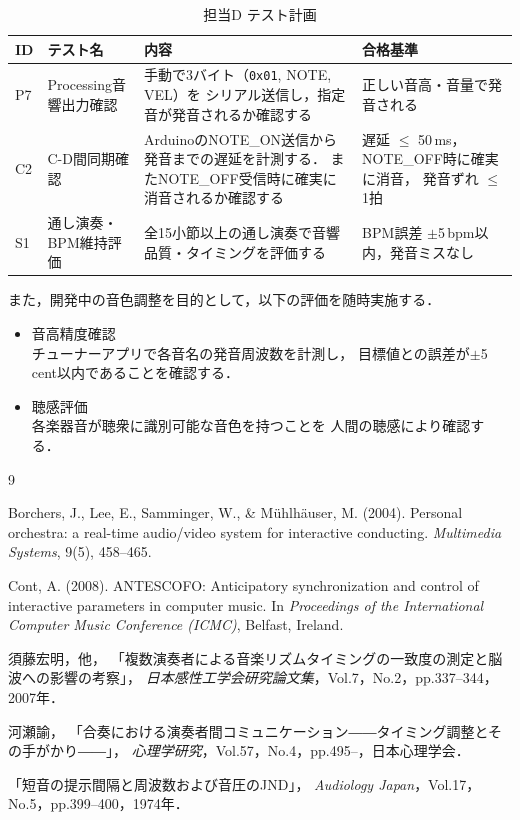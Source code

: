 \documentclass[lualatex,book,paper=a4paper,jafontsize=11.5pt,jafontscale=1.05,oneside]{jlreq}
\begin{document}
\begin{table}[H]
  \centering
  \caption{担当D テスト計画}
  \label{tab:test_d}
  \begin{tabular}{llp{5cm}p{4cm}}
    \hline
    ID & テスト名 & 内容 & 合格基準 \\
    \hline
    P7 & Processing音響出力確認
       & 手動で3バイト（\texttt{0x01}, NOTE, VEL）を
         シリアル送信し，指定音が発音されるか確認する
       & 正しい音高・音量で発音される \\
    C2 & C-D間同期確認
       & ArduinoのNOTE\_ON送信から発音までの遅延を計測する．
         またNOTE\_OFF受信時に確実に消音されるか確認する
       & 遅延 $\leq$ 50\,ms，NOTE\_OFF時に確実に消音，
         発音ずれ $\leq$ 1拍 \\
    S1 & 通し演奏・BPM維持評価
       & 全15小節以上の通し演奏で音響品質・タイミングを評価する
       & BPM誤差 $\pm$5\,bpm以内，発音ミスなし \\
    \hline
  \end{tabular}
\end{table}

また，開発中の音色調整を目的として，以下の評価を随時実施する．

\begin{itemize}
  \item 音高精度確認 \\
  チューナーアプリで各音名の発音周波数を計測し，
  目標値との誤差が$\pm$5\,cent以内であることを確認する．

  \item 聴感評価 \\
  各楽器音が聴衆に識別可能な音色を持つことを
  人間の聴感により確認する．
\end{itemize} 
\begin{thebibliography}{9}

  Borchers, J., Lee, E., Samminger, W., \& M{\"u}hlh{\"a}user, M. (2004).
  Personal orchestra: a real-time audio/video system for interactive conducting.
  \textit{Multimedia Systems}, 9(5), 458--465.

  Cont, A. (2008).
  ANTESCOFO: Anticipatory synchronization and control of interactive parameters in computer music.
  In \textit{Proceedings of the International Computer Music Conference (ICMC)}, Belfast, Ireland.

  須藤宏明，他，
  「複数演奏者による音楽リズムタイミングの一致度の測定と脳波への影響の考察」，
  \textit{日本感性工学会研究論文集}，Vol.7，No.2，pp.337--344，2007年．

  河瀬諭，
  「合奏における演奏者間コミュニケーション――タイミング調整とその手がかり――」，
  \textit{心理学研究}，Vol.57，No.4，pp.495--，日本心理学会．

  「短音の提示間隔と周波数および音圧のJND」，
  \textit{Audiology Japan}，Vol.17，No.5，pp.399--400，1974年．

\end{thebibliography}
\end{document}
